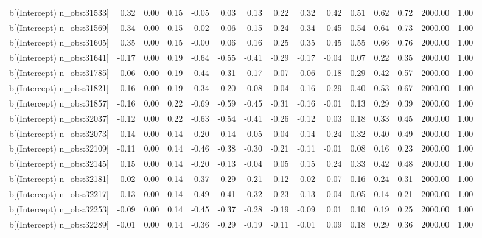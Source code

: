 \begin{table}[ht]
\begin{tabular}{rrrrrrrrrrrrrrr}
  b[(Intercept) n\_obs:31533] & 0.32 & 0.00 & 0.15 & -0.05 & 0.03 & 0.13 & 0.22 & 0.32 & 0.42 & 0.51 & 0.62 & 0.72 & 2000.00 & 1.00 \\ 
  b[(Intercept) n\_obs:31569] & 0.34 & 0.00 & 0.15 & -0.02 & 0.06 & 0.15 & 0.24 & 0.34 & 0.45 & 0.54 & 0.64 & 0.73 & 2000.00 & 1.00 \\ 
  b[(Intercept) n\_obs:31605] & 0.35 & 0.00 & 0.15 & -0.00 & 0.06 & 0.16 & 0.25 & 0.35 & 0.45 & 0.55 & 0.66 & 0.76 & 2000.00 & 1.00 \\ 
  b[(Intercept) n\_obs:31641] & -0.17 & 0.00 & 0.19 & -0.64 & -0.55 & -0.41 & -0.29 & -0.17 & -0.04 & 0.07 & 0.22 & 0.35 & 2000.00 & 1.00 \\ 
  b[(Intercept) n\_obs:31785] & 0.06 & 0.00 & 0.19 & -0.44 & -0.31 & -0.17 & -0.07 & 0.06 & 0.18 & 0.29 & 0.42 & 0.57 & 2000.00 & 1.00 \\ 
  b[(Intercept) n\_obs:31821] & 0.16 & 0.00 & 0.19 & -0.34 & -0.20 & -0.08 & 0.04 & 0.16 & 0.29 & 0.40 & 0.53 & 0.67 & 2000.00 & 1.00 \\ 
  b[(Intercept) n\_obs:31857] & -0.16 & 0.00 & 0.22 & -0.69 & -0.59 & -0.45 & -0.31 & -0.16 & -0.01 & 0.13 & 0.29 & 0.39 & 2000.00 & 1.00 \\ 
  b[(Intercept) n\_obs:32037] & -0.12 & 0.00 & 0.22 & -0.63 & -0.54 & -0.41 & -0.26 & -0.12 & 0.03 & 0.18 & 0.33 & 0.45 & 2000.00 & 1.00 \\ 
  b[(Intercept) n\_obs:32073] & 0.14 & 0.00 & 0.14 & -0.20 & -0.14 & -0.05 & 0.04 & 0.14 & 0.24 & 0.32 & 0.40 & 0.49 & 2000.00 & 1.00 \\ 
  b[(Intercept) n\_obs:32109] & -0.11 & 0.00 & 0.14 & -0.46 & -0.38 & -0.30 & -0.21 & -0.11 & -0.01 & 0.08 & 0.16 & 0.23 & 2000.00 & 1.00 \\ 
  b[(Intercept) n\_obs:32145] & 0.15 & 0.00 & 0.14 & -0.20 & -0.13 & -0.04 & 0.05 & 0.15 & 0.24 & 0.33 & 0.42 & 0.48 & 2000.00 & 1.00 \\ 
  b[(Intercept) n\_obs:32181] & -0.02 & 0.00 & 0.14 & -0.37 & -0.29 & -0.21 & -0.12 & -0.02 & 0.07 & 0.16 & 0.24 & 0.31 & 2000.00 & 1.00 \\ 
  b[(Intercept) n\_obs:32217] & -0.13 & 0.00 & 0.14 & -0.49 & -0.41 & -0.32 & -0.23 & -0.13 & -0.04 & 0.05 & 0.14 & 0.21 & 2000.00 & 1.00 \\ 
  b[(Intercept) n\_obs:32253] & -0.09 & 0.00 & 0.14 & -0.45 & -0.37 & -0.28 & -0.19 & -0.09 & 0.01 & 0.10 & 0.19 & 0.25 & 2000.00 & 1.00 \\ 
  b[(Intercept) n\_obs:32289] & -0.01 & 0.00 & 0.14 & -0.36 & -0.29 & -0.19 & -0.11 & -0.01 & 0.09 & 0.18 & 0.29 & 0.36 & 2000.00 & 1.00 \\ 

\end{tabular}
\end{table}
